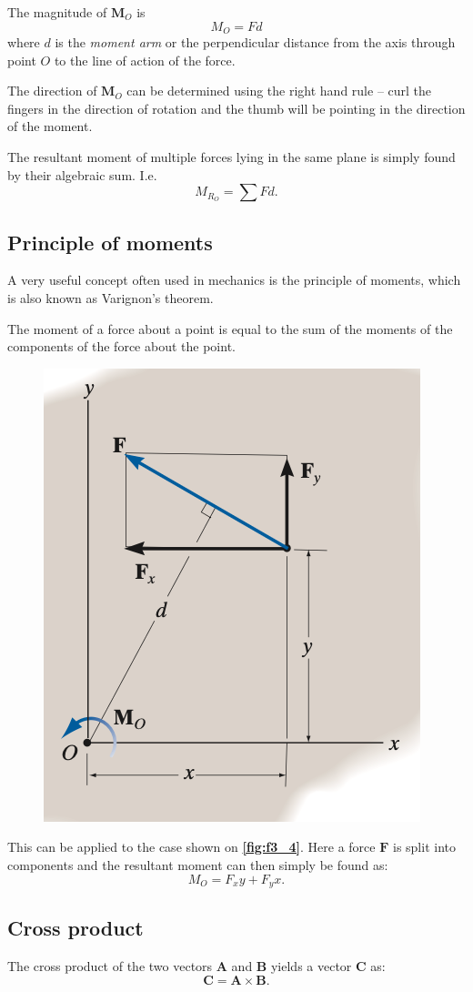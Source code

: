 The magnitude of $\textbf{M}_O$ is
\[ 
  M_O = Fd
\]
where $d$ is the \textit{moment arm} or the perpendicular distance from the axis through point $O$ to the line of action of the force. 

The direction of $\textbf{M}_O$ can be determined using the right hand rule -- curl the fingers in the direction of rotation and the thumb will be pointing in the direction of the moment.

The resultant moment of multiple forces lying in the same plane is simply found by their algebraic sum. I.e.
\[ 
M_{R_O} = \sum F d
.\]

\subsection{Principle of moments}
A very useful concept often used in mechanics is the principle of moments, which is also known as Varignon's theorem.

\begin{definition}
  The moment of a force about a point is equal to the sum of the moments of the components of the force about the point.
\end{definition}

\begin{figure} [ht]
  \centering
  \includegraphics[width=0.35\linewidth]{./figures/f3_4.png}
  \caption{}
  \label{fig:f3_4}
\end{figure}

This can be applied to the case shown on \textbf{\autoref{fig:f3_4}}. Here a force $\textbf{F}$ is split into components and the resultant moment can then simply be found as:
\[ 
M_O = F_x y + F_y x
.\]

\subsection{Cross product}
The cross product of the two vectors $\textbf{A}$ and $\textbf{B}$ yields a vector $\textbf{C}$ as:
\[ 
\textbf{C} = \textbf{A} \times \textbf{B}
.\]

